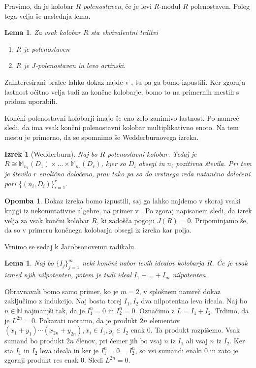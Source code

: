 \documentclass[a4paper, 12pt]{amsart}
\theoremstyle{definition} %
\newtheorem{opomba}[definicija]{Opomba}
\theoremstyle{plain} %
\newtheorem{lema}[definicija]{Lema}
\newtheorem{izrek}[definicija]{Izrek}
\newcommand{\N}{\mathbb N}
\newcommand{\M}{\mathbb M}
\begin{document}
Pravimo, da je kolobar $R$ \emph{polenostaven}, če je levi $R$-modul $R$ polenostaven. Poleg tega velja še naslednja lema.

\begin{lema}
\label{polenostaven=J-polenostaven+artinski}
Za vsak kolobar $R$ sta ekvivalentni trditvi
\begin{enumerate}
\item $R$ je polenostaven
\item $R$ je $J$-polenostaven in levo artinski.
\end{enumerate}
\end{lema}

Zainteresirani bralec lahko dokaz najde v \cite[Izrek 4.14]{Lam}, tu pa ga bomo izpustili. Ker zgornja lastnost očitno velja tudi za končne kolobarje, bomo to na primernih mestih s pridom uporabili.

Končni polenostavni kolobarji  imajo še eno zelo zanimivo lastnost. Po \cite[Trditev 1.6]{Nechaev} namreč sledi, da ima vsak končni polenostavni kolobar multiplikativno enoto. Na tem mestu je primerno, da se spomnimo še Wedderburnovega izreka.

\begin{izrek}[Wedderburn]
\label{Wedderburn}
Naj bo $R$ polenostavni kolobar. Tedaj je $R\cong \M_{n_1}(D_1) \times \dots \times \M_{n_r}(D_r)$, kjer so $D_i$ obsegi in $n_i$ pozitivna števila. Pri tem je število $r$ enolično določeno, prav tako pa so do vrstnega reda natančno določeni pari $\{(n_i,D_i)\}_{i=1}^r$.
\end{izrek}

\begin{opomba}
Dokaz izreka bomo izpustili, saj ga lahko najdemo v skoraj vsaki knjigi iz nekomutativne algebre, na primer v \cite[Izrek 3.5]{Lam}. Po zgoraj napisanem sledi, da izrek velja za vsak končni kolobar $R$, ki zadošča pogoju $J(R) = 0$. Pripominjamo še, da so v primeru končnega kolobarja obsegi iz izreka kar polja.
\end{opomba}

Vrnimo se sedaj k Jacobsonovemu radikalu.

\begin{lema}
Naj bo $\{I_j\}_{j=1}^m$ neki končni nabor levih idealov kolobarja $R$. Če je vsak izmed njih nilpotenten, potem je tudi ideal $I_1 + \dots + I_m$ nilpotenten.
\end{lema}

\proof
Obravnavali bomo samo primer, ko je $m=2$, v splošnem namreč dokaz zaključimo z indukcijo. Naj bosta torej $I_1,I_2$ dva nilpotentna leva ideala. Naj bo $n\in \N$ najmanjši tak, da je $I_1^n = 0$ in $I_2^n = 0$. Označimo z $L=I_1 + I_2$. Trdimo, da je $L^{2n} = 0$. Pokazati moramo, da je produkt $2n$ elementov $(x_1 + y_1) \cdots (x_{2n} + y_{2n}), x_i \in I_1, y_i \in I_2$  enak 0. Ta produkt razpišemo. Vsak sumand bo produkt $2n$ členov, pri čemer jih bo vsaj $n$ iz $I_1$ ali vsaj $n$ iz $I_2$. Ker sta $I_1$ in $I_2$ leva ideala in ker je $I_1^n = 0 = I_2^n$, so vsi sumandi enaki 0 in zato je zgornji produkt res enak 0. Sledi $L^{2n} = 0$.
\endproof
 
\end{document}
